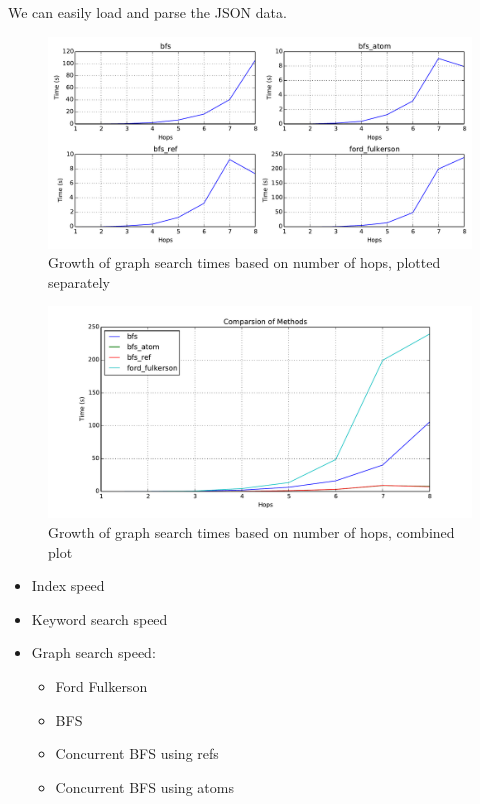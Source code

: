 				We can easily load and parse the JSON data.
				
				\begin{figure}[!ht]
					\centering
					\includegraphics[scale=0.5]{images/methods-subplots}
					
					\caption{Growth of graph search times based on number of hops, plotted separately}
					\label{fig:methods-subplots}
				\end{figure}
				
				\begin{figure}[!ht]
					\centering
					\includegraphics[scale=0.5]{images/methods-compared}
					
					\caption{Growth of graph search times based on number of hops, combined plot}
					\label{fig:methods-compared}
				\end{figure}
		
		\begin{itemize}
			\item Index speed
			\item Keyword search speed
			\item Graph search speed:
				\begin{itemize}
					\item Ford Fulkerson
					\item BFS
					\item Concurrent BFS using refs
					\item Concurrent BFS using atoms
				\end{itemize}
		\end{itemize}
	
